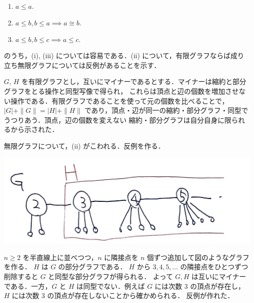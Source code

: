 \subsection{}
\begin{enumerate}
 \item $a\leq a$. 
 \item $a\leq b, b\leq a \implies a \cong b$. 
 \item $a\leq b, b\leq c\implies a\leq c$. 
\end{enumerate}
のうち，(i), (iii) については容易である．(ii) について，有限グラフならば成り立ち無限グラフについては反例があることを示す．

$G$, $H$ を有限グラフとし，互いにマイナーであるとする．マイナーは縮約と部分グラフをとる操作と同型写像で得られ，
これらは頂点と辺の個数を増加させない操作である．有限グラフであることを使って元の個数を比べることで，
$|G|+\|G\| = |H| + \|H\|$ であり，頂点・辺が同一の縮約・部分グラフ・同型でうつりあう．頂点，辺の個数を変えない
縮約・部分グラフは自分自身に限られるから示された．

無限グラフについて，(ii) がこわれる．反例を作る．

\includegraphics[width=\linewidth]{chap1/1_33.png}

$n\geq 2$ を半直線上に並べつつ，$n$ に隣接点を $n$ 個ずつ追加して図のようなグラフを作る．
$H$ は $G$ の部分グラフである．
$H$ から $3,4,5,\ldots$ の隣接点をひとつずつ削除すると $G$ と同型な部分グラフが得られる．
よって $G, H$ は互いにマイナーである．一方，$G$ と $H$ は同型でない．例えば $G$ には次数 $3$ の頂点が存在し，
$H$ には次数 $3$ の頂点が存在しないことから確かめられる．
反例が作れた．